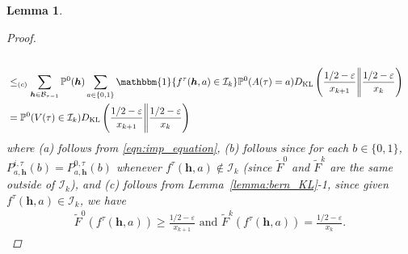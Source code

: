 \documentclass[12pt,draftcls, onecolumn]{IEEEtran}
\renewcommand{\vec}[1]{\ensuremath{\boldsymbol{#1}}}
\newtheorem{lemma}{Lemma}
\begin{document}
{\begin{lemma}
\begin{proof}
\begin{align}
     \nonumber\\& \leq_{(c)} \sum_{\vec{h} \in \mathcal{B}_{\tau-1}}\mathbb{P}^0(\vec{h})\sum_{a \in \{0,1\}}\mathbbm{1}\{f^{\tau}(\vec{h},a) \in \mathcal{I}_k\}\mathbb{P}^0(A(\tau) = a)D_{\text{KL}}\left(\frac{1/2 - \varepsilon}{x_{k+1}}\Bigg{\lVert} \frac{1/2 -\varepsilon}{x_k}\right)  \nonumber\\&= \mathbb{P}^0(V(\tau) \in  \mathcal{I}_k)D_{\text{KL}}\left(\frac{1/2 - \varepsilon}{x_{k+1}}\Bigg{\lVert} \frac{1/2 -\varepsilon}{x_k}\right)  \nonumber
\end{align}
where (a) follows from \eqref{eqn:imp_equation}, (b) follows since for each $b \in \{0,1\}$,  $P^{i,\tau}_{a,\vec{h}}(b) = P^{0,\tau}_{a,\vec{h}}(b)$ whenever $f^{\tau}(\vec{h},a) \not\in \mathcal{I}_k$ (since $\tilde{F}^0$ and $\tilde{F}^k$ are the same outside of $\mathcal{I}_k$), and (c) follows from Lemma~\ref{lemma:bern_KL}-1, since given $f^{\tau}(\vec{h},a) \in \mathcal{I}_k$, we have
\begin{align}
     \tilde{F}^0(f^{\tau}(\vec{h},a)) \geq \frac{1/2 - \varepsilon}{x_{k+1}} \text{ and } \tilde{F}^k(f^{\tau}(\vec{h},a)) = \frac{1/2 - \varepsilon}{x_{k}}. \nonumber
\end{align}


\end{proof}
\end{lemma}}
\end{document}

